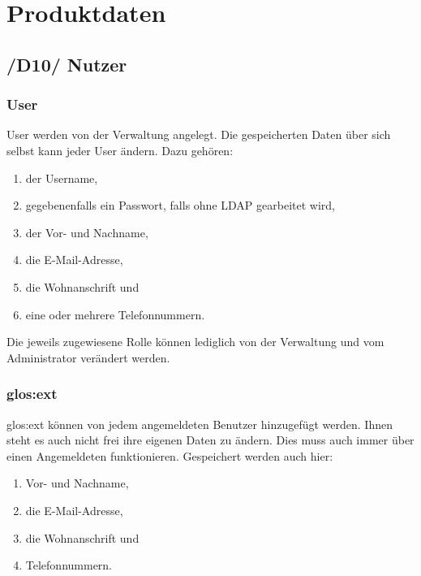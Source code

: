 
\chapter{Produktdaten}

\section{/D10/ Nutzer}
\subsection{User}
User werden von der Verwaltung angelegt. Die gespeicherten Daten über sich selbst kann jeder User ändern. Dazu gehören: 
\begin{enumerate}
	\item der Username, 
	\item gegebenenfalls ein Passwort, falls ohne \gls{LDAP} gearbeitet wird,
	\item der Vor- und Nachname, 
	\item die E-Mail-Adresse, 
	\item die Wohnanschrift und 
	\item eine oder mehrere Telefonnummern. 
\end{enumerate} 
Die jeweils zugewiesene Rolle können lediglich von der Verwaltung und vom Administrator verändert werden.

\subsection{\gls{glos:ext}}
\gls{glos:ext} können von jedem angemeldeten Benutzer hinzugefügt werden. Ihnen steht es auch nicht frei ihre eigenen Daten zu ändern. Dies muss auch immer über einen Angemeldeten funktionieren. Gespeichert werden auch hier: 
\begin{enumerate}
	\item Vor- und Nachname, 
	\item die E-Mail-Adresse, 
	\item die Wohnanschrift und 
	\item Telefonnummern.
\end{enumerate}

